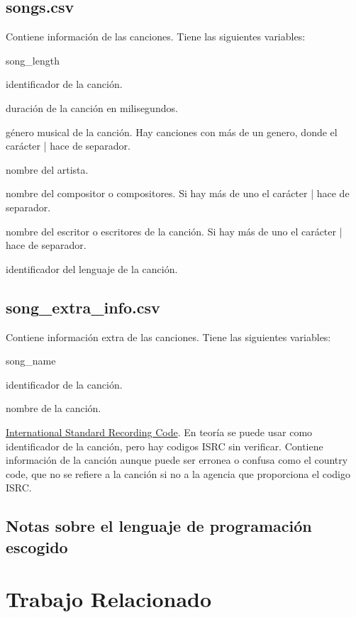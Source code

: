 \documentclass[a4paper]{article}
\begin{document}
\subsection*{songs.csv}
Contiene información de las canciones. Tiene las siguientes variables:
\begin{labeling}{song\_length}
\item [song\_id] identificador de la canción.
\item [song\_length] duración de la canción en milisegundos.
\item [genre\_ids] género musical de la canción. Hay canciones con más de un genero, donde el carácter | hace de separador.
\item [artist\_name] nombre del artista.
\item [composer] nombre del compositor o compositores. Si hay más de uno el carácter | hace de separador.
\item [lyricist] nombre del escritor o escritores de la canción. Si hay más de uno el carácter | hace de separador.
\item [language] identificador del lenguaje de la canción.
\end{labeling}

\subsection*{song\_extra\_info.csv}
Contiene información extra de las canciones. Tiene las siguientes variables:
\begin{labeling}{song\_name}
\item [song\_id] identificador de la canción.
\item [song\_name] nombre de la canción.
\item [isrc] \href{https://en.wikipedia.org/wiki/International_Standard_Recording_Code}{International Standard Recording Code}. En teoría se puede usar como identificador de la canción, pero hay codigos ISRC sin verificar. Contiene información de la canción aunque puede ser erronea o confusa como el country code, que no se refiere a la canción si no a la agencia que proporciona el codigo ISRC.
\end{labeling}


\subsection{Notas sobre el lenguaje de programación escogido}


\section{Trabajo Relacionado}
\end{document}
